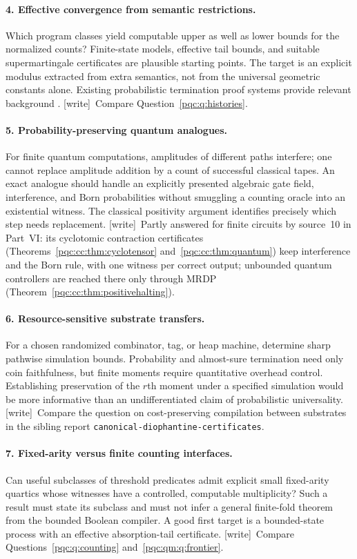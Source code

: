 \documentclass[11pt,letterpaper]{article}
\numberwithin{equation}{section}
\theoremstyle{definition}
\theoremstyle{remark}
\newcommand{\code}[1]{\nolinkurl{#1}}
\newcommand{\wtag}{\textup{[write]}}
\begin{document}
\paragraph{4. Effective convergence from semantic restrictions.}
Which program classes yield computable upper as well as lower bounds for
the normalized counts? Finite-state models, effective tail bounds, and
suitable supermartingale certificates are plausible starting points.
The target is an explicit modulus extracted from extra semantics, not
from the universal geometric constants alone. Existing probabilistic
termination proof systems provide relevant background \cite{b62s13-majumdar2024}. \wtag\ Compare Question~\ref{pqc:q:histories}.

\paragraph{5. Probability-preserving quantum analogues.}
For finite quantum computations, amplitudes of different paths interfere;
one cannot replace amplitude addition by a count of successful classical
tapes. An exact analogue should handle an explicitly presented algebraic
gate field, interference, and Born probabilities without smuggling a
counting oracle into an existential witness. The classical positivity
argument identifies precisely which step needs replacement. \wtag\ Partly answered for finite circuits by source~10 in Part~VI: its cyclotomic contraction certificates (Theorems~\ref{pqc:cc:thm:cyclotensor} and~\ref{pqc:cc:thm:quantum}) keep interference and the Born rule, with one witness per correct output; unbounded quantum controllers are reached there only through MRDP (Theorem~\ref{pqc:cc:thm:positivehalting}).

\paragraph{6. Resource-sensitive substrate transfers.}
For a chosen randomized combinator, tag, or heap machine, determine sharp
pathwise simulation bounds. Probability and almost-sure termination need
only coin faithfulness, but finite moments require quantitative overhead
control. Establishing preservation of the $r$th moment under a specified
simulation would be more informative than an undifferentiated claim of
probabilistic universality. \wtag\ Compare the question on cost-preserving compilation between substrates in the sibling report \code{canonical-diophantine-certificates}.

\paragraph{7. Fixed-arity versus finite counting interfaces.}
Can useful subclasses of threshold predicates admit explicit small
fixed-arity quartics whose witnesses have a controlled, computable
multiplicity? Such a result must state its subclass and must not infer a
general finite-fold theorem from the bounded Boolean compiler. A good
first target is a bounded-state process with an effective absorption-tail
certificate. \wtag\ Compare Questions~\ref{pqc:q:counting} and~\ref{pqc:qm:q:frontier}.
\end{document}
